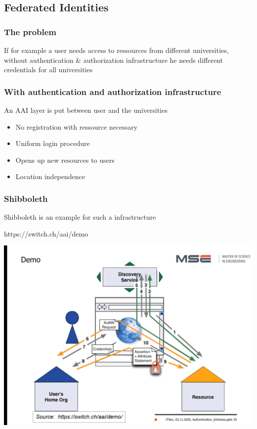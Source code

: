 \documentclass[12pt]{article}
\begin{document}
\subsection*{Federated Identities}
\subsubsection*{The problem}
If for example a user needs access to ressources from different universities, without authentication & authorization infrastructure he needs different credentials for all universities

\subsubsection*{With authentication and authorization infrastructure}
An AAI layer is put between user and the universities
\begin{itemize}
    \item No registration with ressource necessary
    \item Uniform login procedure
    \item Opens up new resources to users
    \item Location independence
\end{itemize}

\subsubsection*{Shibboleth}
Shibboleth is an example for such a infrastructure

https://switch.ch/aai/demo

\includegraphics[width=\textwidth]{ShibbolethDemo.png}
\end{document}

